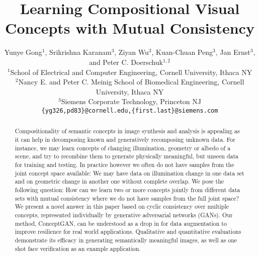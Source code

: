\documentclass[10pt,twocolumn,letterpaper]{article}
\begin{document}
\title{Learning Compositional Visual Concepts with Mutual Consistency}

\author{Yunye Gong$^{1}$, Srikrishna Karanam$^{3}$, Ziyan Wu$^{3}$, Kuan-Chuan Peng$^{3}$, Jan Ernst$^{3}$, and Peter C. Doerschuk$^{1,2}$\\
$^{1}$School of Electrical and Computer Engineering, Cornell University, Ithaca NY\\
$^{2}$Nancy E. and Peter C. Meinig School of Biomedical Engineering, Cornell University, Ithaca NY\\
$^{3}$Siemens Corporate Technology, Princeton NJ\\
{\tt\small \{yg326,pd83\}@cornell.edu,\{first.last\}@siemens.com}
}



\begin{abstract}
\vspace{-1em}



Compositionality of semantic concepts in image synthesis and analysis is appealing as it can help in decomposing known and generatively recomposing unknown data. For instance, we may learn concepts of changing illumination, geometry or albedo of a scene, and try to recombine them to generate physically meaningful, but unseen data for training and testing. In practice however we often do not have samples from the joint concept space available: We may have data on illumination change in one data set and on geometric change in another one without complete overlap. We pose the following question: How can we learn two or more concepts jointly from different data sets with mutual consistency where we do not have samples from the full joint space? We present a novel answer in this paper based on cyclic consistency over multiple concepts, represented individually by generative adversarial networks (GANs). Our method, ConceptGAN, can be understood as a drop in for data augmentation to improve resilience for real world applications. Qualitative and quantitative evaluations demonstrate its efficacy in generating semantically meaningful images, as well as one shot face verification as an example application.

\end{abstract}
\end{document}
